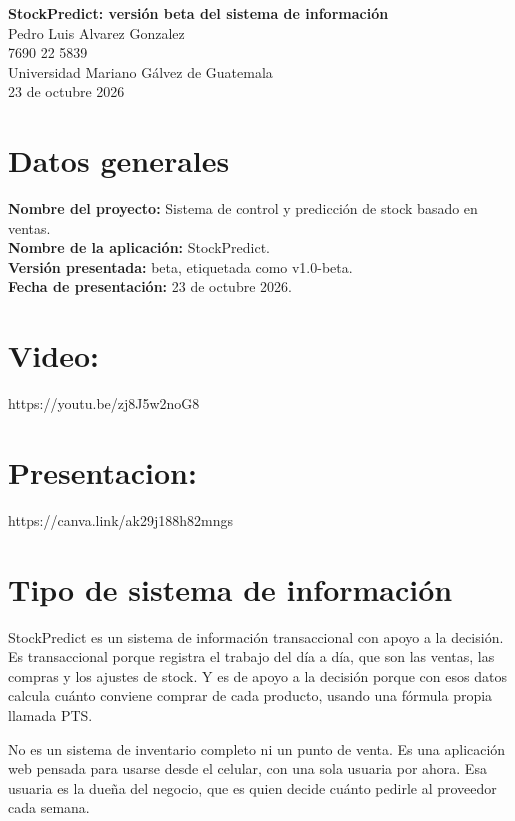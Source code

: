 \documentclass[12pt,letterpaper]{article}
\newcommand{\fechapresentacion}{23 de octubre 2026}
\begin{document}
\begin{center}
{\Large\bfseries StockPredict: versión beta del sistema de información}\\[8pt]
Pedro Luis Alvarez Gonzalez\\
7690 22 5839\\
Universidad Mariano Gálvez de Guatemala\\
\fechapresentacion
\end{center}

\section{Datos generales}

\textbf{Nombre del proyecto:} Sistema de control y predicción de stock basado en ventas.\\
\textbf{Nombre de la aplicación:} StockPredict.\\
\textbf{Versión presentada:} beta, etiquetada como v1.0-beta.\\
\textbf{Fecha de presentación:} \fechapresentacion.


\section{Video:} https://youtu.be/zj8J5w2noG8\\
\section{Presentacion:} https://canva.link/ak29j188h82mngs\\

\section{Tipo de sistema de información}

StockPredict es un sistema de información transaccional con apoyo a la decisión. Es transaccional porque registra el trabajo del día a día, que son las ventas, las compras y los ajustes de stock. Y es de apoyo a la decisión porque con esos datos calcula cuánto conviene comprar de cada producto, usando una fórmula propia llamada PTS.

No es un sistema de inventario completo ni un punto de venta. Es una aplicación web pensada para usarse desde el celular, con una sola usuaria por ahora. Esa usuaria es la dueña del negocio, que es quien decide cuánto pedirle al proveedor cada semana.
\end{document}
